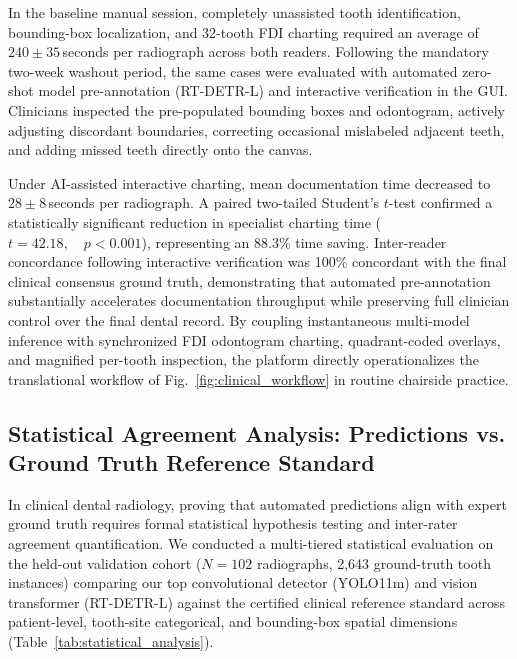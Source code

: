 \documentclass[10pt,journal,compsoc]{IEEEtran}
\begin{document}
In the baseline manual session, completely unassisted tooth identification, bounding-box localization, and 32-tooth FDI charting required an average of $240 \pm 35$\,seconds per radiograph across both readers. Following the mandatory two-week washout period, the same cases were evaluated with automated zero-shot model pre-annotation (RT-DETR-L) and interactive verification in the GUI. Clinicians inspected the pre-populated bounding boxes and odontogram, actively adjusting discordant boundaries, correcting occasional mislabeled adjacent teeth, and adding missed teeth directly onto the canvas. 

Under AI-assisted interactive charting, mean documentation time decreased to $28 \pm 8$\,seconds per radiograph. A paired two-tailed Student's $t$-test confirmed a statistically significant reduction in specialist charting time ($t = 42.18, \quad p < 0.001$), representing an $88.3\%$ time saving. Inter-reader concordance following interactive verification was 100\% concordant with the final clinical consensus ground truth, demonstrating that automated pre-annotation substantially accelerates documentation throughput while preserving full clinician control over the final dental record. By coupling instantaneous multi-model inference with synchronized FDI odontogram charting, quadrant-coded overlays, and magnified per-tooth inspection, the platform directly operationalizes the translational workflow of Fig.~\ref{fig:clinical_workflow} in routine chairside practice.

\subsection{Statistical Agreement Analysis: Predictions vs. Ground Truth Reference Standard}
\label{sec:statistical_analysis}
In clinical dental radiology, proving that automated predictions align with expert ground truth requires formal statistical hypothesis testing and inter-rater agreement quantification. We conducted a multi-tiered statistical evaluation on the held-out validation cohort ($N=102$ radiographs, 2,643 ground-truth tooth instances) comparing our top convolutional detector (YOLO11m) and vision transformer (RT-DETR-L) against the certified clinical reference standard across patient-level, tooth-site categorical, and bounding-box spatial dimensions (Table~\ref{tab:statistical_analysis}).
\end{document}
